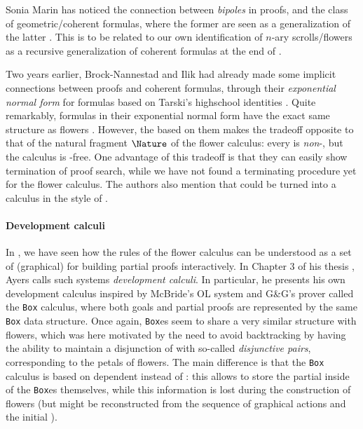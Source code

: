 \begin{scope}
Sonia Marin has noticed the connection between \emph{bipoles} in  proofs,
and the class of geometric/coherent formulas, where the former are seen as a
generalization of the latter . This is to be related
to our own identification of $n$-ary scrolls/flowers as a recursive
generalization of coherent formulas at the end of .

Two years earlier, Brock-Nannestad and Ilik had already made some implicit
connections between  proofs and coherent formulas, through their
\emph{exponential normal form} for  formulas based on Tarski's
highschool identities . Quite
remarkably,  formulas in their exponential normal form have the exact
same structure as flowers
\cite[Definition~4.2]{brock-nannestad_intuitionistic_2019}. However, the   based on them makes the tradeoff opposite to that of the
natural fragment $\Nature$ of the flower calculus: every  is
\emph{non}-, but the calculus is -free. One advantage of
this tradeoff is that they can easily show termination of proof search, while we
have not found a terminating procedure yet for the flower calculus. The authors
also mention that  could be turned into a  calculus in the
style of .

\paragraph{Development calculi}

In , we have seen how the rules of the flower calculus
can be understood as a set of (graphical)  for building partial proofs
interactively. In Chapter 3 of his thesis , Ayers calls
such systems \emph{development calculi}. In particular, he presents his own
development calculus inspired by McBride's OL system
 and G\&G's prover
 called the \texttt{Box} calculus, where both
goals and partial proofs are represented by the same \texttt{Box} data
structure. Once again, \texttt{Box}es seem to share a very similar structure
with flowers, which was here motivated by the need to avoid backtracking by
having the ability to maintain a disjunction of  with so-called
\emph{disjunctive pairs}, corresponding to the petals of flowers. The main
difference is that the \texttt{Box} calculus is based on dependent 
instead of : this allows to store the partial 
inside of the \texttt{Box}es themselves, while this information is lost during
the construction of flowers (but might be reconstructed from the sequence of
graphical actions and the initial ).


\end{scope}
